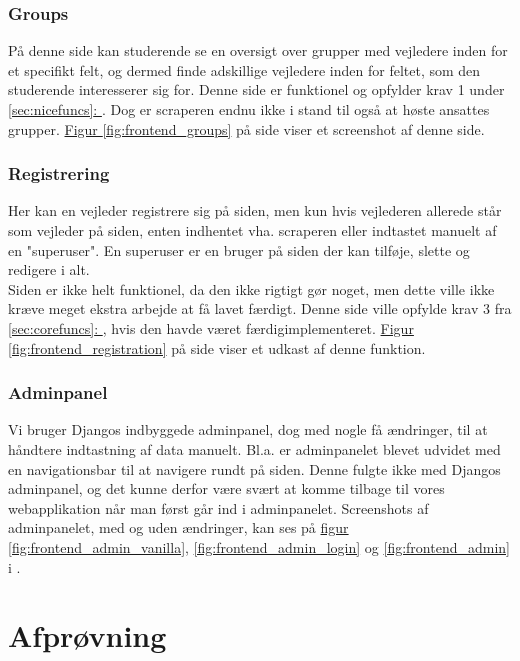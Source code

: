 \documentclass[12pt]{article}
\begin{document}
\subsubsection{Groups}
På denne side kan studerende se en oversigt over grupper med vejledere inden for et specifikt felt, og dermed finde adskillige vejledere inden for feltet, som den studerende interesserer sig for.
Denne side er funktionel og opfylder krav 1 under \hyperref[sec:nicefuncs]{\ref*{sec:nicefuncs}: }. Dog er scraperen endnu ikke i stand til også at høste ansattes grupper. \hyperref[fig:frontend_groups]{Figur \ref*{fig:frontend_groups}} på side \pageref{fig:frontend_groups} viser et screenshot af denne side.

\subsubsection{Registrering}
Her kan en vejleder registrere sig på siden, men kun hvis vejlederen allerede står som vejleder på siden, enten indhentet vha. scraperen eller indtastet manuelt af en "superuser". En superuser er en bruger på siden der kan tilføje, slette og redigere i alt.\\
Siden er ikke helt funktionel, da den ikke rigtigt gør noget, men dette ville ikke kræve meget ekstra arbejde at få lavet færdigt.
Denne side ville opfylde krav 3 fra \hyperref[sec:corefuncs]{\ref*{sec:corefuncs}: }, hvis den havde været færdigimplementeret. \hyperref[fig:frontend_registration]{Figur \ref*{fig:frontend_registration}} på side \pageref{fig:frontend_registration} viser et udkast af denne funktion.

\subsubsection{Adminpanel}
Vi bruger Djangos indbyggede adminpanel, dog med nogle få ændringer, til at håndtere indtastning af data manuelt. Bl.a. er adminpanelet blevet udvidet med en navigationsbar til at navigere rundt på siden. Denne fulgte ikke med Djangos adminpanel, og det kunne derfor være svært at komme tilbage til vores webapplikation når man først går ind i adminpanelet. Screenshots af adminpanelet, med og uden ændringer, kan ses på \hyperref[fig:frontend_admin_vanilla]{figur \ref*{fig:frontend_admin_vanilla}}, \ref{fig:frontend_admin_login} og \ref{fig:frontend_admin} i .

\section{Afprøvning}
\label{sec:afproevning}
\end{document}
